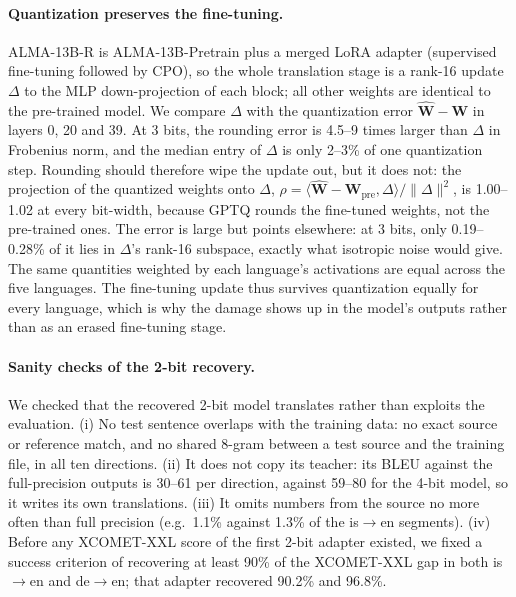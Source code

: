 \documentclass[10pt]{article}
\begin{document}
\paragraph{Quantization preserves the fine-tuning.} ALMA-13B-R is
ALMA-13B-Pretrain plus a merged LoRA adapter (supervised fine-tuning followed by
CPO), so the whole translation stage is a rank-16 update $\Delta$ to the MLP
down-projection of each block; all other weights are identical to the
pre-trained model. We compare $\Delta$ with the quantization error
$\widehat{\mathbf{W}}-\mathbf{W}$ in layers 0, 20 and 39. At 3 bits, the
rounding error is 4.5--9 times larger than $\Delta$ in Frobenius norm, and the
median entry of $\Delta$ is only 2--3\% of one quantization step. Rounding should
therefore wipe the update out, but it does not: the projection of the quantized
weights onto $\Delta$,
$\rho=\langle\widehat{\mathbf{W}}-\mathbf{W}_{\text{pre}},\Delta\rangle/\lVert\Delta\rVert^2$,
is 1.00--1.02 at every bit-width, because GPTQ rounds the fine-tuned weights, not
the pre-trained ones. The error is large but points elsewhere: at 3 bits, only
0.19--0.28\% of it lies in $\Delta$'s rank-16 subspace, exactly what isotropic
noise would give. The same quantities weighted by each language's activations
are equal across the five languages. The fine-tuning update thus survives
quantization equally for every language, which is why the damage shows up in the
model's outputs rather than as an erased fine-tuning stage.

\paragraph{Sanity checks of the 2-bit recovery.} We checked that the recovered
2-bit model translates rather than exploits the evaluation. (i) No test
sentence overlaps with the training data: no exact source or reference match,
and no shared 8-gram between a test source and the training file, in all ten
directions. (ii) It does not copy its teacher: its BLEU against the
full-precision outputs is 30--61 per direction, against 59--80 for the 4-bit
model, so it writes its own translations. (iii) It omits numbers from the source
no more often than full precision (e.g.\ 1.1\% against 1.3\% of the
is$\rightarrow$en segments). (iv) Before any XCOMET-XXL score of the first 2-bit
adapter existed, we fixed a success criterion of recovering at least 90\% of the
XCOMET-XXL gap in both is$\rightarrow$en and de$\rightarrow$en; that adapter
recovered 90.2\% and 96.8\%.
\end{document}
